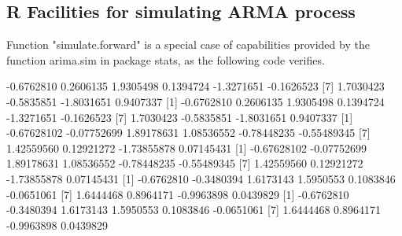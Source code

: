 \subsection{R Facilities for simulating ARMA process}
Function "simulate.forward" is a special case of capabilities provided by
the function arima.sim in package stats, as the following code verifies.
\begin{Schunk}
\begin{Soutput}
 [1] -0.6762810  0.2606135  1.9305498  0.1394724 -1.3271651 -0.1626523
 [7]  1.7030423 -0.5835851 -1.8031651  0.9407337
 [1] -0.6762810  0.2606135  1.9305498  0.1394724 -1.3271651 -0.1626523
 [7]  1.7030423 -0.5835851 -1.8031651  0.9407337
 [1] -0.67628102 -0.07752699  1.89178631  1.08536552 -0.78448235 -0.55489345
 [7]  1.42559560  0.12921272 -1.73855878  0.07145431
 [1] -0.67628102 -0.07752699  1.89178631  1.08536552 -0.78448235 -0.55489345
 [7]  1.42559560  0.12921272 -1.73855878  0.07145431
 [1] -0.6762810 -0.3480394  1.6173143  1.5950553  0.1083846 -0.0651061
 [7]  1.6444468  0.8964171 -0.9963898  0.0439829
 [1] -0.6762810 -0.3480394  1.6173143  1.5950553  0.1083846 -0.0651061
 [7]  1.6444468  0.8964171 -0.9963898  0.0439829
\end{Soutput}
\end{Schunk}

